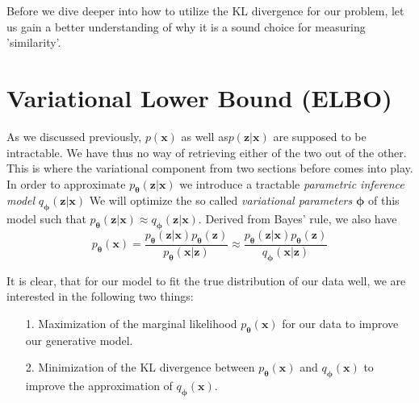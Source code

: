\documentclass[12pt]{report}
\begin{document}
Before we dive deeper into how to utilize the KL divergence for our problem, let us gain a better understanding of why it is a sound choice for measuring 'similarity'. %

\section{Variational Lower Bound (ELBO)}
As we discussed previously, $p(\mathbf{x})$ as well as$p(\mathbf{z}|\mathbf{x})$ are supposed to be intractable. We have thus no way of retrieving either of the two out of the other. This is where the variational component from two sections before comes into play. In order to approximate $p_{\mathbf{\theta}}(\mathbf{z}|\mathbf{x})$ we introduce a tractable \emph{parametric inference model} $q_{\mathbf{\phi}}(\mathbf{z}|\mathbf{x})$ We will optimize the so called \emph{variational parameters} $\mathbf{\phi}$ of this model such that $p_{\mathbf{\theta}}(\mathbf{z}|\mathbf{x}) \approx q_{\mathbf{\phi}}(\mathbf{z}|\mathbf{x})$.
Derived from Bayes' rule, we also have
\begin{equation}
	p_{\mathbf{\theta}}(\mathbf{x}) = \frac{p_{\mathbf{\theta}}(\mathbf{z}|\mathbf{x}) p_{\mathbf{\theta}}(\mathbf{z})}{p_{\mathbf{\theta}}(\mathbf{x}|\mathbf{z})} \approx  \frac{p_{\mathbf{\theta}}(\mathbf{z}|\mathbf{x}) p_{\mathbf{\theta}}(\mathbf{z})}{q_{\mathbf{\phi}}(\mathbf{x}|\mathbf{z})}
\end{equation}

It is clear, that for our model to fit the true distribution of our data well, we are interested in the following two things:
\begin{itemize}
	\item[1.] Maximization of the marginal likelihood $p_{\mathbf{\theta}}(\mathbf{x})$ for our data to improve our generative model.
	\item[2.] Minimization of the KL divergence between $p_{\mathbf{\theta}}(\mathbf{x})$ and $q_{\mathbf{\phi}}(\mathbf{x})$ to improve the approximation of $q_{\mathbf{\phi}}(\mathbf{x})$.
\end{itemize}
\end{document}
